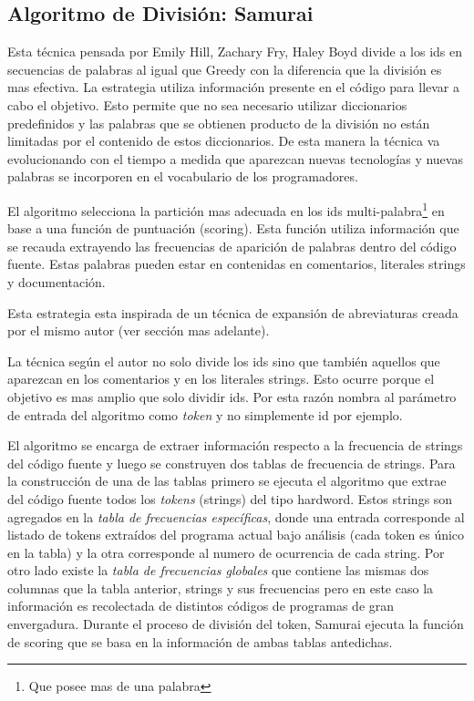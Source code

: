 \documentclass[12pt]{report}
\begin{document}
\subsection{Algoritmo de División: Samurai}

Esta técnica pensada por Emily Hill, Zachary Fry, Haley Boyd\cite{EHPV09} divide a los ids en secuencias de palabras al igual que Greedy con la diferencia que la división es mas efectiva. La estrategia utiliza información presente en el código para llevar a cabo el objetivo. Esto permite que no sea necesario utilizar diccionarios predefinidos y las palabras que se obtienen producto de la división no están limitadas por el contenido de estos diccionarios. De esta manera la técnica va evolucionando con el tiempo a medida que aparezcan nuevas tecnologías y nuevas palabras se incorporen en el vocabulario de los programadores.

El algoritmo selecciona la partición mas adecuada en los ids multi-palabra\footnote[1]{Que posee mas de una palabra} en base a una función de puntuación (scoring). Esta función utiliza información que se recauda extrayendo las frecuencias de aparición de palabras dentro del código fuente. Estas palabras pueden estar en contenidas en comentarios, literales strings y documentación.

Esta estrategia esta inspirada de un técnica de expansión de abreviaturas\cite{EZH08} creada por el mismo autor (ver sección mas adelante).

La técnica según el autor\cite{EHPV09} no solo divide los ids sino que también aquellos que aparezcan en los comentarios y en los literales strings. Esto ocurre porque el objetivo es mas amplio que solo dividir ids. Por esta razón nombra al parámetro de entrada del algoritmo como \textit{token} y no simplemente id por ejemplo.

El algoritmo se encarga de extraer información respecto a la frecuencia de strings del código fuente y luego se construyen dos tablas de frecuencia de strings. Para la construcción de una de las tablas primero se ejecuta el algoritmo que extrae del código fuente todos los \textit{tokens} (strings) del tipo hardword. Estos strings son agregados en la \textit{tabla de frecuencias específicas}, donde una entrada corresponde al listado de tokens extraídos del programa actual bajo análisis (cada token es único en la tabla) y la otra corresponde al numero de ocurrencia de cada string. Por otro lado existe la \textit{tabla de frecuencias globales} que contiene las mismas dos columnas que la tabla anterior, strings y sus frecuencias pero en este caso la información es recolectada de distintos códigos de programas de gran envergadura. Durante el proceso de división del token, Samurai ejecuta la función de scoring que se basa en la información de ambas tablas antedichas\cite{EHPV09}.
\end{document}
